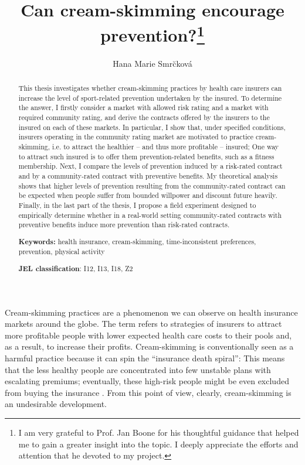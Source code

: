 \documentclass[12pt,english]{article}%
\makeatletter
\renewcommand{\section}{\@startsection{section}{1}{0mm}{-1.5\baselineskip}{0.8\baselineskip}{\normalfont\large\centering}}
\makeatother
\begin{document}
\title{Can cream-skimming encourage prevention?\thanks{I am very grateful to Prof. Jan Boone for his thoughtful guidance that helped me to gain a greater insight into the topic. I deeply appreciate the efforts and attention that he devoted to my project.}}
\author{Hana Marie Smr\u{c}kov\'{a}} \maketitle

\begin{abstract}
\noindent This thesis investigates whether cream-skimming practices by health care insurers can increase the level of sport-related prevention undertaken by the insured. To determine the answer, I firstly consider a market with allowed risk rating and a market with required community rating, and derive the contracts offered by the insurers to the insured on each of these markets. In particular, I show that, under specified conditions, insurers operating in the community rating market are motivated to practice cream-skimming, i.e. to attract the healthier -- and thus more profitable -- insured; One way to attract such insured is to offer them prevention-related benefits, such as a fitness membership. Next, I compare the levels of prevention induced by a risk-rated contract and by a community-rated contract with preventive benefits. My theoretical analysis shows that higher levels of prevention resulting from the community-rated contract can be expected when people suffer from bounded willpower and discount future heavily. Finally, in the last part of the thesis, I propose a field experiment designed to empirically determine whether in a real-world setting community-rated contracts with preventive benefits induce more prevention than risk-rated contracts.
 
\medskip
\noindent\textbf{Keywords:} health insurance, cream-skimming, time-inconsistent preferences, prevention, physical activity

\medskip

\noindent\textbf{JEL classification}: I12, I13, I18, Z2

\end{abstract}

\newpage

\section{Introduction}
Cream-skimming practices are a phenomenon we can observe on health insurance markets around the globe. The term refers to strategies of insurers to attract more profitable people with lower expected health care costs to their pools and, as a result, to increase their profits.  Cream-skimming is conventionally seen as a harmful practice because it can spin the “insurance death spiral”: This means that the less healthy people are concentrated into few unstable plans with escalating premiums; eventually, these high-risk people might be even excluded from buying the insurance \citep{cooper2012}. From this point of view, clearly, cream-skimming is an undesirable development.
\end{document}
